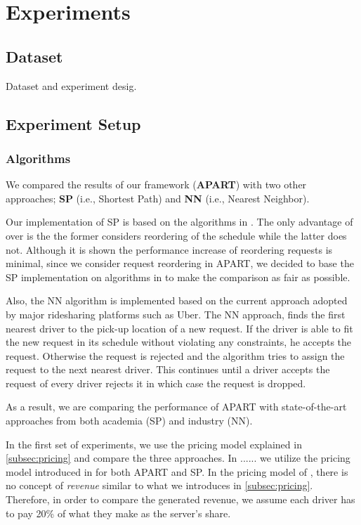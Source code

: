 \section{Experiments}

\subsection{Dataset}
Dataset and experiment desig.

\subsection{Experiment Setup}

\subsubsection{Algorithms}
We compared the results of our framework (\textbf{APART}) with two other approaches; \textbf{SP} (i.e., Shortest Path) and \textbf{NN} (i.e., Nearest Neighbor).

Our implementation of SP is based on the algorithms in \cite{Huang14}. The only advantage of \cite{Huang14} over \cite{Ma13} is the the former considers reordering of the schedule while the latter does not. Although it is shown the performance increase of reordering requests is minimal, since we consider request reordering in APART, we decided to base the SP implementation on algorithms in \cite{Huang14} to make the comparison as fair as possible.

Also, the NN algorithm is implemented based on the current approach adopted by major ridesharing platforms such as Uber. The NN approach, finds the first nearest driver to the pick-up location of a new request. If the driver is able to fit the new request in its schedule without violating any constraints, he accepts the request. Otherwise the request is rejected and the algorithm tries to assign the request to the next nearest driver. This continues until a driver accepts the request of every driver rejects it in which case the request is dropped.

As a result, we are comparing the performance of APART with state-of-the-art approaches from both academia (SP) and industry (NN).

In the first set of experiments, we use the pricing model explained in \cref{subsec:pricing} and compare the three approaches. In ...... we utilize the pricing model introduced in \cite{Ma15} for both APART and SP. In the pricing model of \cite{Ma15}, there is no concept of \textit{revenue} similar to what we introduces in \cref{subsec:pricing}. Therefore, in order to compare the generated revenue, we assume each driver has to pay 20\% of what they make as the server's share.

